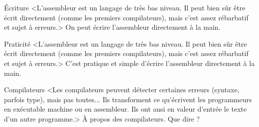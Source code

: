 \begin{quiz}[title={Langage machine}]
\vspace{-\baselineskip}
\begin{quizquestion*}[b]{1}{2}{Écriture}
<L'assembleur est un langage de très bas niveau. Il peut bien sûr être écrit directement (comme les premiers compilateurs), mais c'est assez rébarbatif et sujet à erreurs.>
On peut écrire l'assembleur directement à la main.
\end{quizquestion*}

\begin{quizquestion*}[b]{2}{1}{Praticité}
<L'assembleur est un langage de très bas niveau. Il peut bien sûr être écrit directement (comme les premiers compilateurs), mais c'est assez rébarbatif et sujet à erreurs.>
C'est pratique et simple d'écrire l'assembleur directement à la main.
\end{quizquestion*}
\end{quiz}

\begin{quiz}[title={Compilation}]
\vspace{-\baselineskip}
\begin{quizquestion}[b]{1}{2}{Compilateurs}
<Les compilateurs peuvent détecter certaines erreurs (syntaxe, parfois type), mais pas toutes...
Ils transforment ce qu'écrivent les programmeurs en exécutable machine ou en assembleur. Ils ont ansi en valeur d'entrée le texte d'un autre programme.>
À propos des compilateurs. Que dire ?
\end{quizquestion}
\end{quiz}


